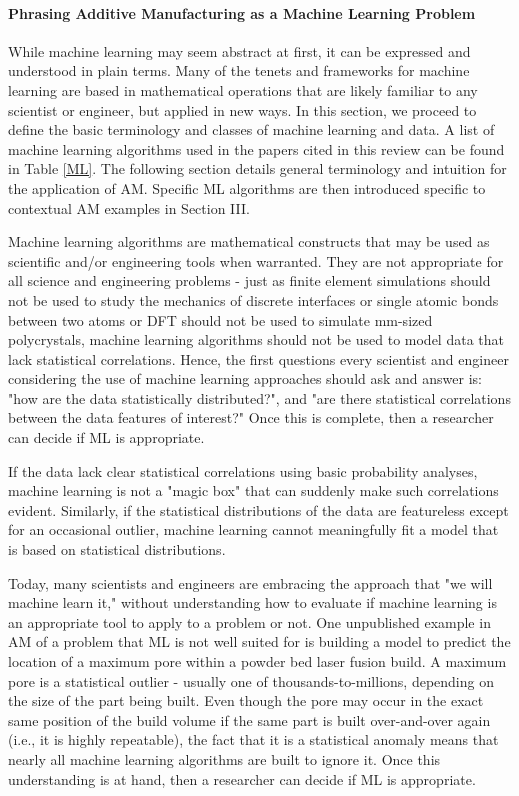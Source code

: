 \paragraph{Phrasing Additive Manufacturing as a Machine Learning Problem}\label{phrasing}
While machine learning may seem abstract at first, it can be expressed and understood in plain terms. Many of the tenets and frameworks for machine learning are based in mathematical operations that are likely familiar to any scientist or engineer, but applied in new ways. In this section, we proceed to define the basic terminology and classes of machine learning and data. A list of machine learning algorithms used in the papers cited in this review can be found in Table \ref{ML}. The following section details general terminology and intuition for the application of AM. Specific ML algorithms are then introduced specific to contextual AM examples in Section III.

Machine learning algorithms are mathematical constructs that may be used as scientific and/or engineering tools when warranted. They are not appropriate for all science and engineering problems - just as finite element simulations should not be used to study the mechanics of discrete interfaces or single atomic bonds between two atoms or DFT should not be used to simulate mm-sized polycrystals, machine learning algorithms should not be used to model data that lack statistical correlations. Hence, the first questions every scientist and engineer considering the use of machine learning approaches should ask and answer is: "how are the data statistically distributed?", and "are there statistical correlations between the data features of interest?" Once this is complete, then a researcher can decide if ML is appropriate.

If the data lack clear statistical correlations using basic probability analyses, machine learning is not a "magic box" that can suddenly make such correlations evident. Similarly, if the statistical distributions of the data are featureless except for an occasional outlier, machine learning cannot meaningfully fit a model that is based on statistical distributions. 

Today, many scientists and engineers are embracing the approach that "we will machine learn it," without understanding how to evaluate if machine learning is an appropriate tool to apply to a problem or not. One unpublished example in AM of a problem that ML is not well suited for is building a model to predict the location of a maximum pore within a powder bed laser fusion build. A maximum pore is a statistical outlier - usually one of thousands-to-millions, depending on the size of the part being built. Even though the pore may occur in the exact same position of the build volume if the same part is built over-and-over again (i.e., it is highly repeatable), the fact that it is a statistical anomaly means that nearly all machine learning algorithms are built to ignore it. Once this understanding is at hand, then a researcher can decide if ML is appropriate.

